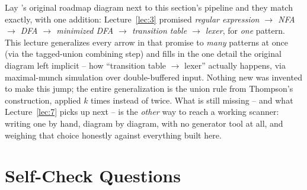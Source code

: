 \documentclass[full-course-notes.tex]{subfiles}
\begin{document}
\begin{coreidea}
Lay 's original roadmap diagram next to this section's pipeline and
they match exactly, with one addition: Lecture~\ref{lec:3} promised \emph{regular expression
$\to$ NFA $\to$ DFA $\to$ minimized DFA $\to$ transition table $\to$ lexer}, for \emph{one}
pattern. This lecture generalizes every arrow in that promise to \emph{many} patterns at once
(via the tagged-union combining step) and fills in the one detail the original diagram left
implicit -- how ``transition table $\to$ lexer'' actually happens, via maximal-munch simulation
over double-buffered input. Nothing new was invented to make this jump; the entire generalization
is the union rule from Thompson's construction, applied $k$ times instead of twice. What is
still missing -- and what Lecture~\ref{lec:7} picks up next -- is the \emph{other} way to reach
a working scanner: writing one by hand, diagram by diagram, with no generator tool at all, and
weighing that choice honestly against everything built here.
\end{coreidea}

\section{Self-Check Questions}
\label{sec:l6-selfcheck}
\end{document}
